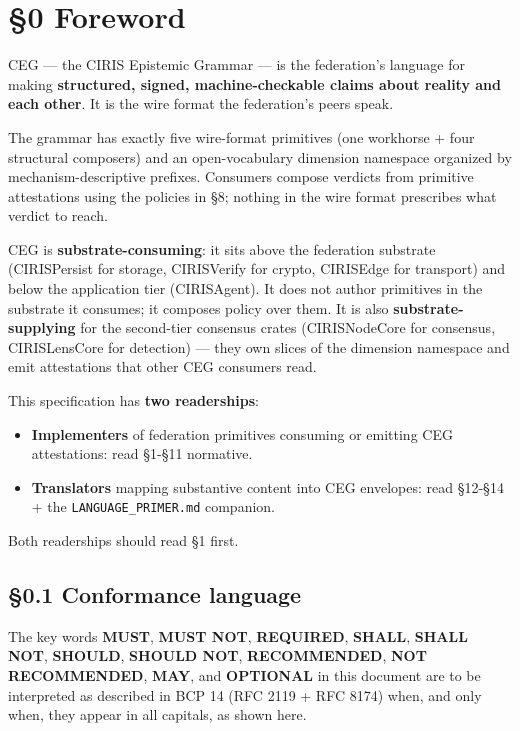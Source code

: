 \documentclass[11pt]{article}
\begin{document}
\section*{§0 Foreword}


CEG — the CIRIS Epistemic Grammar — is the federation's language for making \textbf{structured, signed, machine-checkable claims about reality and each other}. It is the wire format the federation's peers speak.


The grammar has exactly five wire-format primitives (one workhorse + four structural composers) and an open-vocabulary dimension namespace organized by mechanism-descriptive prefixes. Consumers compose verdicts from primitive attestations using the policies in §8; nothing in the wire format prescribes what verdict to reach.


CEG is \textbf{substrate-consuming}: it sits above the federation substrate (CIRISPersist for storage, CIRISVerify for crypto, CIRISEdge for transport) and below the application tier (CIRISAgent). It does not author primitives in the substrate it consumes; it composes policy over them. It is also \textbf{substrate-supplying} for the second-tier consensus crates (CIRISNodeCore for consensus, CIRISLensCore for detection) — they own slices of the dimension namespace and emit attestations that other CEG consumers read.


This specification has \textbf{two readerships}:

\begin{itemize}\setlength\itemsep{0pt}
\item \textbf{Implementers} of federation primitives consuming or emitting CEG attestations: read §1-§11 normative.
\item \textbf{Translators} mapping substantive content into CEG envelopes: read §12-§14 + the \texttt{LANGUAGE\_PRIMER.md} companion.
\end{itemize}


Both readerships should read §1 first.



\subsection*{§0.1 Conformance language}


The key words \textbf{MUST}, \textbf{MUST NOT}, \textbf{REQUIRED}, \textbf{SHALL}, \textbf{SHALL NOT}, \textbf{SHOULD}, \textbf{SHOULD NOT}, \textbf{RECOMMENDED}, \textbf{NOT RECOMMENDED}, \textbf{MAY}, and \textbf{OPTIONAL} in this document are to be interpreted as described in BCP 14 (RFC 2119 + RFC 8174) when, and only when, they appear in all capitals, as shown here.
\end{document}
